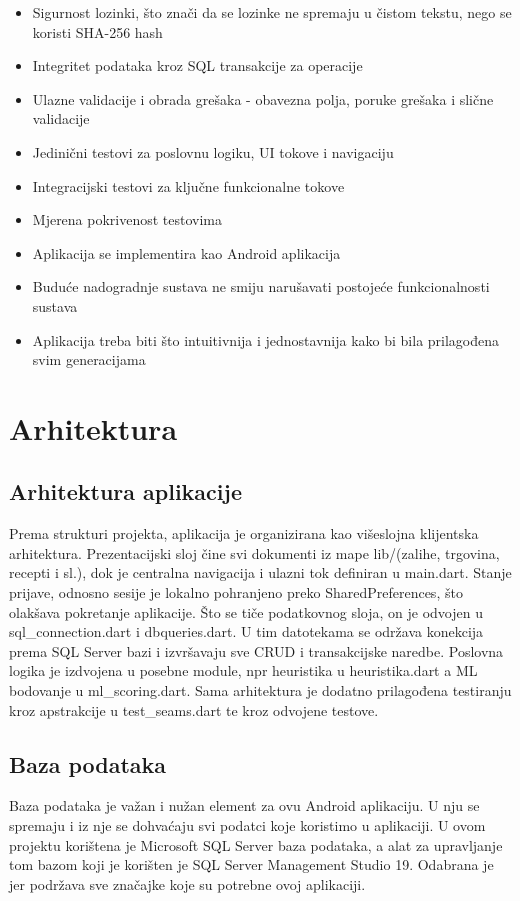 \documentclass[diplomskirad]{fer}
\begin{document}
\begin{itemize}
    \item Sigurnost lozinki, što znači da se lozinke ne spremaju u čistom tekstu, nego se koristi SHA-256 hash
    \item Integritet podataka kroz SQL transakcije za operacije
    \item Ulazne validacije i obrada grešaka - obavezna polja, poruke grešaka i slične validacije
    \item Jedinični testovi za poslovnu logiku, UI tokove i navigaciju
    \item Integracijski testovi za ključne funkcionalne tokove
    \item Mjerena pokrivenost testovima
    \item Aplikacija se implementira kao Android aplikacija 
    \item Buduće nadogradnje sustava ne smiju narušavati postojeće funkcionalnosti sustava
    \item Aplikacija treba biti što intuitivnija i jednostavnija kako bi bila prilagođena svim generacijama
\end{itemize}

\chapter{Arhitektura}
\section{Arhitektura aplikacije}
Prema strukturi projekta, aplikacija je organizirana kao višeslojna klijentska arhitektura. Prezentacijski sloj čine svi dokumenti iz mape lib/(zalihe, trgovina, recepti i sl.), dok je centralna navigacija i ulazni tok definiran u main.dart. Stanje prijave, odnosno sesije je lokalno pohranjeno preko SharedPreferences, što olakšava pokretanje aplikacije. Što se tiče podatkovnog sloja, on je odvojen u sql\_connection.dart i dbqueries.dart. U tim datotekama se održava konekcija prema SQL Server bazi i izvršavaju sve CRUD i transakcijske naredbe. Poslovna logika je izdvojena u posebne module, npr heuristika u heuristika.dart a ML bodovanje u ml\_scoring.dart. Sama arhitektura je dodatno prilagođena testiranju kroz apstrakcije u test\_seams.dart te kroz odvojene testove. 


\section{Baza podataka}
Baza podataka je važan i nužan element za ovu Android aplikaciju. U nju se spremaju i iz nje se dohvaćaju svi podatci koje koristimo u aplikaciji. U ovom projektu korištena je Microsoft SQL Server baza podataka, a alat za upravljanje tom bazom koji je korišten je SQL Server Management Studio 19. Odabrana je jer podržava sve značajke koje su potrebne ovoj aplikaciji.
\end{document}
